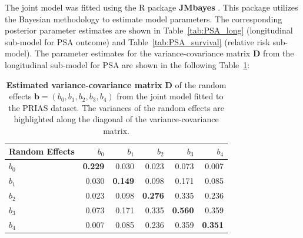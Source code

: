 The joint model was fitted using the R package \textbf{JMbayes} \citep{rizopoulosJMbayes}. This package utilizes the Bayesian methodology to estimate model parameters. The corresponding posterior parameter estimates are shown in Table~\ref{tab:PSA_long} (longitudinal sub-model for PSA outcome) and Table~\ref{tab:PSA_survival} (relative risk sub-model). The parameter estimates for the variance-covariance matrix $\boldsymbol{D}$ from the longitudinal sub-model for PSA are shown in the following Table~\ref{tab:D_matrix}:
\begin{table}
\small\sf\centering
\caption{\textbf{Estimated variance-covariance matrix} $\boldsymbol{D}$ of the random effects ${\boldsymbol{b}=(b_{0}, b_{1}, b_{2}, b_{3}, b_{4})}$ from the joint model fitted to the PRIAS dataset. The variances of the random effects are highlighted along the diagonal of the variance-covariance matrix.}
\label{tab:D_matrix}
\begin{tabular}{lrrrrr}
\hline
Random Effects    & $b_{0}$    & $b_{1}$   & $b_{2}$   & $b_{3}$   & $b_{4}$    \\
\hline
$b_{0}$ & \textbf{0.229} & 0.030 & 0.023 & 0.073 & 0.007 \\
$b_{1}$ & 0.030 & \textbf{0.149} & 0.098 & 0.171 & 0.085 \\
$b_{2}$ & 0.023 & 0.098 & \textbf{0.276} & 0.335 & 0.236 \\
$b_{3}$ & 0.073 & 0.171 & 0.335 & \textbf{0.560} & 0.359 \\
$b_{4}$ & 0.007 & 0.085 & 0.236 & 0.359 & \textbf{0.351} \\
\hline
\end{tabular}
\end{table}

